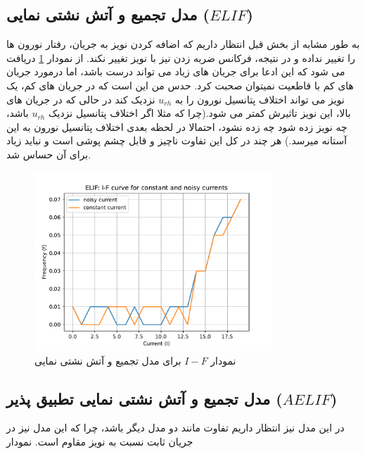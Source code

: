 \documentclass{article}
\begin{document}
        \subsection{مدل تجمیع و آتش نشتی نمایی ($ELIF$)}
            به طور مشابه از بخش قبل انتظار داریم که اضافه کردن نویز به جریان، رفتار نورون ها را تغییر نداده و در نتیجه، فرکانس ضربه زدن نیز با نویز تغییر نکند. از نمودار
            \ref{fig:elif-noise-curr-I-F}
            دریافت می شود که این ادعا برای جریان های زیاد می تواند درست باشد، اما درمورد جریان های کم با قاطعیت نمیتوان صحبت کرد. حدس من این است که در جریان های کم، یک نویز می تواند اختلاف پتانسیل نورون را به 
            $u_{rh}$ 
            نزدیک کند در حالی که در جریان های بالا، این نویز تاثیرش کمتر می شود.(چرا که مثلا اگر اختلاف پتانسیل نزدیک 
            $u_{rh}$ 
            باشد، چه نویز زده شود چه زده نشود، احتمالا در لحظه بعدی اختلاف پتانسیل نورون به این آستانه میرسد.)
            هر چند در کل این تفاوت ناچیز و قابل چشم پوشی است و نباید زیاد برای آن حساس شد. 
            \begin{figure}[H]
                \centering
                \includegraphics[width=0.8\textwidth]{plots/ELIF: I-F curve for constant and noisy currents.pdf} 
                \caption{نمودار $I-F$ برای مدل تجمیع و آتش نشتی نمایی  }
                \label{fig:elif-noise-curr-I-F}
            \end{figure}
            \subsection{مدل تجمیع و آتش نشتی نمایی تطبیق پذیر ($AELIF$)}
                در این مدل نیز انتظار داریم تفاوت مانند دو مدل دیگر باشد، چرا که این مدل نیز در جریان ثابت نسبت به نویز مقاوم است. نمودار 
\end{document}
